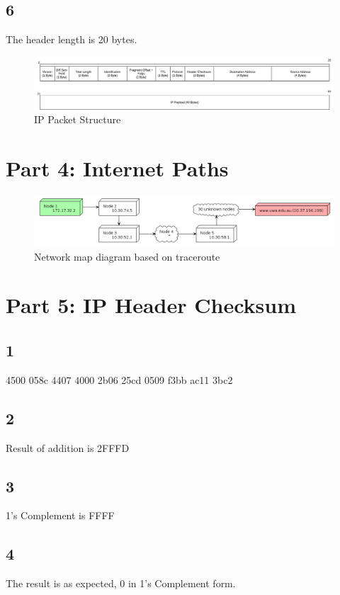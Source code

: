\documentclass{article}
\begin{document}
    \subsection*{6}
    The header length is 20 bytes.
    \begin{figure}[htbp]
        \centering
        \includegraphics[width=\textwidth]{images/part3.drawio.png}
        \caption{IP Packet Structure}
    \end{figure}
    \section*{Part 4: Internet Paths}
    \begin{figure}[htbp]
        \centering
        \includegraphics[width=\textwidth]{images/part4.plantuml.png}
        \caption{Network map diagram based on traceroute}
    \end{figure}
    \clearpage
    
    \section*{Part 5: IP Header Checksum}
    \subsection*{1}
    4500 058c 4407 4000 2b06 25cd 0509 f3bb ac11 3bc2
    \subsection*{2}
    Result of addition is 2FFFD
    \subsection*{3}
    1's Complement is FFFF
    \subsection*{4}
    The result is as expected, 0 in 1's Complement form.
\end{document}
